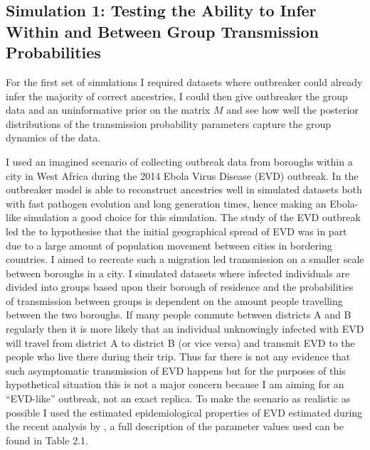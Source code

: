\documentclass[11pt,a4paper]{report}
\begin{document}
\subsection{Simulation 1: Testing the Ability to Infer Within and Between Group Transmission Probabilities}
For the first set of simulations I required datasets where outbreaker could already infer the majority of correct ancestries, I could then give outbreaker the group data and an uninformative prior on the matrix $M$ and see how well the posterior distributions of the transmission probability parameters capture the group dynamics of the data.

I used an imagined scenario of collecting outbreak data from boroughs within a city in West Africa during the 2014 Ebola Virus Disease (EVD) outbreak. In \citet{outbrkr} the outbreaker model is able to reconstruct ancestries well in simulated datasets both with fast pathogen evolution and long generation times, hence making an Ebola-like simulation a good choice for this simulation. The study of the EVD outbreak led the \citet{Ebola14} to hypothesise that the initial geographical spread of EVD was in part due to a large amount of population movement between cities in bordering countries. I aimed to recreate such a migration led transmission on a smaller scale between boroughs in a city. I simulated datasets where infected individuals are divided into groups based upon their borough of residence and the probabilities of transmission between groups is dependent on the amount people travelling between the two boroughs. If many people commute between districts A and B regularly then it is more likely that an individual unknowingly infected with EVD will travel from district A to district B (or vice versa) and transmit EVD to the people who live there during their trip. Thus far there is not any evidence that such asymptomatic transmission of EVD happens but for the purposes of this hypothetical situation this is not a major concern because I am aiming for an ``EVD-like'' outbreak, not an exact replica. To make the scenario as realistic as possible  I used the estimated epidemiological properties of EVD estimated during the recent analysis by \citet{Ebola14}, a full description of the parameter values used can be found in Table 2.1.
\end{document}
